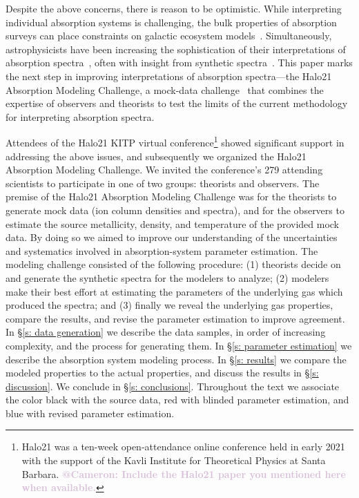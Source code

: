 \documentclass[fleqn,usenatbib]{mnras}
\makeatletter
\newcommand{\atcameron}[1]{\textcolor{Thistle}{\textbf{@Cameron: #1}}}
\makeatother
\begin{document}
Despite the above concerns, there is reason to be optimistic.
While interpreting individual absorption systems is challenging, the bulk properties of absorption surveys can place constraints on galactic ecosystem models~\citep[e.g.][]{Sorini2018, Lan2018}.
Simultaneously, astrophysicists have been increasing the sophistication of their interpretations of absorption spectra~\citep[e.g.][]{Churchill2015, Sameer2021}, often with insight from synthetic spectra~\citep[e.g.][]{Hummels2013, Liang2018}.
This paper marks the next step in improving interpretations of absorption spectra---the Halo21 Absorption Modeling Challenge, a mock-data challenge~\citep[e.g.][]{Regimbau2012, Meacher2015, Hazboun2019} that combines the expertise of observers and theorists to test the limits of the current methodology for interpreting absorption spectra.

Attendees of the Halo21 KITP virtual conference\footnote{Halo21 was a ten-week open-attendance online conference held in early 2021 with the support of the Kavli Institute for Theoretical Physics at Santa Barbara. \atcameron{Include the Halo21 paper you mentioned here when available.}}
showed significant support in addressing the above issues, and subsequently we organized the Halo21 Absorption Modeling Challenge.
We invited the conference's 279 attending scientists to participate in one of two groups:
theorists and observers.
The premise of the Halo21 Absorption Modeling Challenge was for the theorists to generate mock data (ion column densities and spectra), and for the observers to estimate the source metallicity, density, and temperature of the provided mock data.
By doing so we aimed to improve our understanding of the uncertainties and systematics involved in absorption-system parameter estimation.
The modeling challenge consisted of the following procedure:
(1) theorists decide on and generate the synthetic spectra for the modelers to analyze; (2) modelers make their best effort at estimating the parameters of the underlying gas which produced the spectra; and (3) finally we reveal the underlying gas properties, compare the results, and revise the parameter estimation to improve agreement.
In \S\ref{s: data generation} we describe the data samples, in order of increasing complexity, and the process for generating them.
In \S\ref{s:  parameter estimation} we describe the absorption system modeling process.
In \S\ref{s: results} we compare the modeled properties to the actual properties, and discuss the results in \S\ref{s: discussion}.
We conclude in \S\ref{s: conclusions}.
Throughout the text we associate the color black with the source data,
red with blinded parameter estimation,
and blue with revised parameter estimation.
\end{document}
